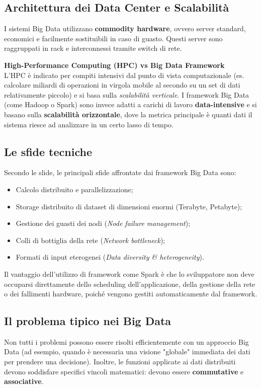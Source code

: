 \subsection{Architettura dei Data Center e Scalabilità}
I sistemi Big Data utilizzano \textbf{commodity hardware}, ovvero server standard, economici e facilmente sostituibili in caso di guasto. Questi server sono raggruppati in rack e interconnessi tramite switch di rete. 

\begin{remark}
\textbf{High-Performance Computing (HPC) vs Big Data Framework}\\
L'HPC è indicato per compiti intensivi dal punto di vista computazionale (es. calcolare miliardi di operazioni in virgola mobile al secondo su un set di dati relativamente piccolo) e si basa sulla \textit{scalabilità verticale}. I framework Big Data (come Hadoop o Spark) sono invece adatti a carichi di lavoro \textbf{data-intensive} e si basano sulla \textbf{scalabilità orizzontale}, dove la metrica principale è quanti dati il sistema riesce ad analizzare in un certo lasso di tempo.
\end{remark}

\subsection{Le sfide tecniche}
Secondo le slide, le principali sfide affrontate dai framework Big Data sono:
\begin{itemize}
    \item Calcolo distribuito e parallelizzazione;
    \item Storage distribuito di dataset di dimensioni enormi (Terabyte, Petabyte);
    \item Gestione dei guasti dei nodi (\textit{Node failure management});
    \item Colli di bottiglia della rete (\textit{Network bottleneck});
    \item Formati di input eterogenei (\textit{Data diversity \& heterogeneity}).
\end{itemize}
Il vantaggio dell'utilizzo di framework come Spark è che lo sviluppatore non deve occuparsi direttamente dello scheduling dell'applicazione, della gestione della rete o dei fallimenti hardware, poiché vengono gestiti automaticamente dal framework.

\subsection{Il problema tipico nei Big Data}
Non tutti i problemi possono essere risolti efficientemente con un approccio Big Data (ad esempio, quando è necessaria una visione "globale" immediata dei dati per prendere una decisione). 
Inoltre, le funzioni applicate ai dati distribuiti devono soddisfare specifici vincoli matematici: devono essere \textbf{commutative} e \textbf{associative}.

